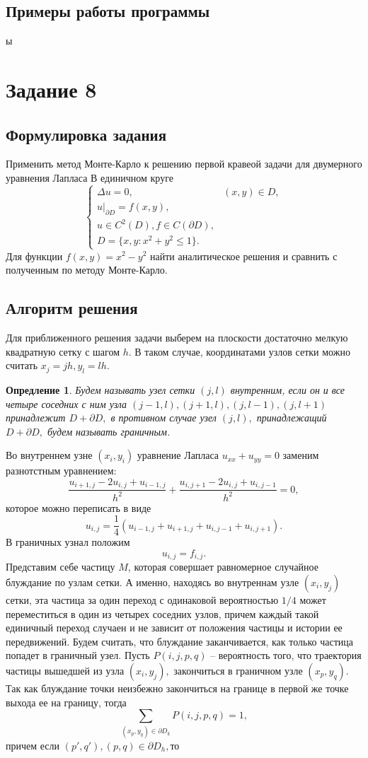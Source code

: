 \documentclass[11pt]{article}
\newtheorem{definition}{Опредление}
\numberwithin{equation}{section}
\begin{document}
\subsection{Примеры работы программы}
ы
\section{Задание 8}
\subsection{Формулировка задания}
Применить метод Монте-Карло к решению первой кравеой задачи для двумерного уравнения Лапласа
В единичном круге
\begin{equation*}
  \begin{cases}
    \Delta u=0,  & (x,y) \in D,\\
    u \bigg|_{\partial D} = f(x,y),\\
    u \in C^2(D),f \in C(\partial D),\\
    D = \{ x,y : x^2 + y^2 \leq 1\}.
  \end{cases}
\end{equation*}
Для функции $f(x,y) = x^2-y^2$ найти аналитическое решения и сравнить с
полученным по методу Монте-Карло.
\subsection{Алгоритм решения}
Для приближенного решения задачи выберем на плоскости достаточно мелкую квадратную сетку с шагом $h$.
В таком случае, координатами узлов сетки можно считать $x_j =jh, y_l =lh.$
\begin{definition}
  Будем называть узел сетки $(j,l)$ внутренним, если он и все четыре соседних с ним узла
  $(j-1,l), (j+1,l), (j, l-1), (j, l+1)$ принадлежит $D + \partial D, $ в противном случае узел $(j,l),$ 
  принадлежащий $D+\partial D,$ будем называть граничным.
\end{definition}

Во внутреннем узне $(x_i, y_i)$ уравнение Лапласа $u_{xx}+u_{yy}=0$
заменим разнотстным уравнением:
$$ \frac{u_{i+1,j}-2u_{i,j}+u_{i-1,j}}{h^2} + \frac{u_{i,j+1}-2u_{i,j}+u_{i,j-1}}{h^2}=0,$$
которое можно переписать в виде
$$ u_{i,j} = \frac{1}{4}(u_{i-1,j}+u_{i+1,j}+u_{i,j-1}+u_{i,j+1}).$$
В граничных узнал положим 
$$ u_{i,j} = f_{i,j}.$$
Представим себе частицу $M$, которая совершает равномерное случайное блуждание 
по узлам сетки. А именно, находясь во внутреннам узле $(x_i, y_j)$ сетки, 
эта частица за один переход с одинаковой вероятностью $1/4$ может переместиться в один из четырех
соседних узлов, причем каждый такой единичный переход случаен и не зависит от положения частицы и истории ее передвижений.
Будем считать, что блуждание заканчивается, как только частица попадет в граничный узел.
Пусть $P(i,j,p,q)$ -- вероятность того, что траектория частицы вышедшей из узла
$(x_i,y_j),$ закончиться в граничном узле $(x_p,y_q).$ Так как блуждание точки неизбежно закончиться на границе в первой же точке выхода ее на границу, тогда
$$ \sum_{(x_p,y_q) \in \partial D_k} P(i,j,p,q) =1,$$  
причем если $(p', q'), (p,q) \in \partial D_h,$то
\end{document}

